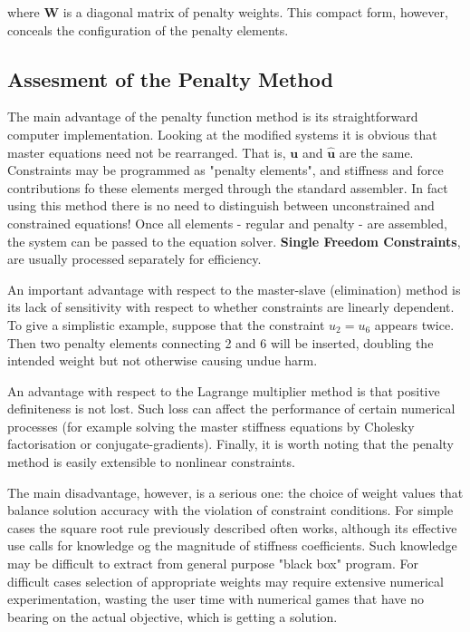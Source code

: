\documentclass[10pt,b5paper,titlepage]{book}
\newcommand{\m}{\mathbf}
\begin{document}
where $ \m{W} $ is a diagonal matrix of penalty weights. This compact form,
however, conceals the configuration of the penalty elements.


\subsection{Assesment of the Penalty Method}

The main advantage of the penalty function method is its straightforward computer
implementation. Looking at the modified systems it is obvious that master equations
need not be rearranged. That is, $ \m{u} $ and $ \m{\hat{u}} $ are the same.
Constraints may be programmed as "penalty elements", and stiffness and force
contributions fo these elements merged through the standard assembler. In fact
using this method there is no need to distinguish between unconstrained and
constrained equations! Once all elements - regular and penalty - are assembled,
the system can be passed to the equation solver. \textbf{Single Freedom Constraints},
are usually processed separately for efficiency.

An important advantage with respect to the master-slave (elimination) method
is its lack of sensitivity with respect to whether constraints are linearly
dependent. To give a simplistic example, suppose that the constraint
$ u_2 = u_6 $ appears twice. Then two penalty elements connecting 2 and 6 will
be inserted, doubling the intended weight but not otherwise causing undue harm.

An advantage with respect to the Lagrange multiplier method is that positive
definiteness is not lost. Such loss can affect the performance of certain numerical
processes (for example solving the master stiffness equations by Cholesky
factorisation or conjugate-gradients). Finally, it is worth noting that the
penalty method is easily extensible to nonlinear constraints.

The main disadvantage, however, is a serious one: the choice of weight values
that balance solution accuracy with the violation of constraint conditions.
For simple cases the square root rule previously described often works, although
its effective use calls for knowledge og the magnitude of stiffness coefficients.
Such knowledge may be difficult to extract from general purpose "black box" program.
For difficult cases selection of appropriate weights may require extensive
numerical experimentation, wasting the user time with numerical games that have
no bearing on the actual objective, which is getting a solution.
\end{document}
